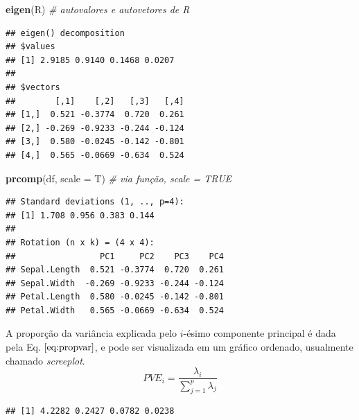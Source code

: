 \documentclass[
]{book}
\newenvironment{Shaded}{\begin{snugshade}}{\end{snugshade}}
\newcommand{\CommentTok}[1]{\textcolor[rgb]{0.56,0.35,0.01}{\textit{#1}}}
\newcommand{\DataTypeTok}[1]{\textcolor[rgb]{0.13,0.29,0.53}{#1}}
\newcommand{\KeywordTok}[1]{\textcolor[rgb]{0.13,0.29,0.53}{\textbf{#1}}}
\newcommand{\NormalTok}[1]{#1}
\newcommand{\OperatorTok}[1]{\textcolor[rgb]{0.81,0.36,0.00}{\textbf{#1}}}
\newcommand{\StringTok}[1]{\textcolor[rgb]{0.31,0.60,0.02}{#1}}
\theoremstyle{definition}
\theoremstyle{definition}
\theoremstyle{definition}
\theoremstyle{remark}
\begin{document}
\begin{Shaded}
\begin{Highlighting}[]
\KeywordTok{eigen}\NormalTok{(R)        }\CommentTok{\# autovalores e autovetores de R}
\end{Highlighting}
\end{Shaded}

\begin{verbatim}
## eigen() decomposition
## $values
## [1] 2.9185 0.9140 0.1468 0.0207
## 
## $vectors
##        [,1]    [,2]   [,3]   [,4]
## [1,]  0.521 -0.3774  0.720  0.261
## [2,] -0.269 -0.9233 -0.244 -0.124
## [3,]  0.580 -0.0245 -0.142 -0.801
## [4,]  0.565 -0.0669 -0.634  0.524
\end{verbatim}

\begin{Shaded}
\begin{Highlighting}[]
\KeywordTok{prcomp}\NormalTok{(df, }\DataTypeTok{scale =}\NormalTok{ T)  }\CommentTok{\# via função, scale = TRUE}
\end{Highlighting}
\end{Shaded}

\begin{verbatim}
## Standard deviations (1, .., p=4):
## [1] 1.708 0.956 0.383 0.144
## 
## Rotation (n x k) = (4 x 4):
##                 PC1     PC2    PC3    PC4
## Sepal.Length  0.521 -0.3774  0.720  0.261
## Sepal.Width  -0.269 -0.9233 -0.244 -0.124
## Petal.Length  0.580 -0.0245 -0.142 -0.801
## Petal.Width   0.565 -0.0669 -0.634  0.524
\end{verbatim}

A proporção da variância explicada pelo \(i\)-ésimo componente principal é dada pela Eq. \(\eqref{eq:propvar}\), e pode ser visualizada em um gráfico ordenado, usualmente chamado \emph{screeplot}.
\begin{equation}
PVE_i = \dfrac{\lambda_i}{\sum_{j=1}^{p} \lambda_j}
\label{eq:propvar}
\end{equation}

\begin{Shaded}
\end{Shaded}

\begin{verbatim}
## [1] 4.2282 0.2427 0.0782 0.0238
\end{verbatim}
\end{document}
